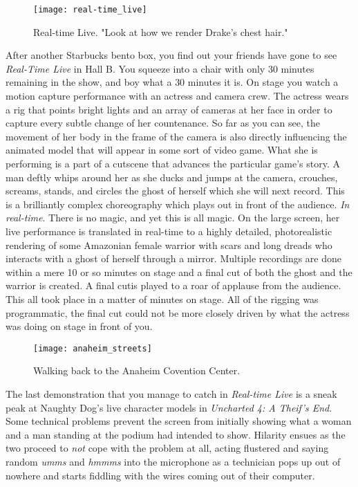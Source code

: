 \documentclass[../main.tex]{subfiles}
\begin{document}
\begin{figure}[h!]
	\centering
	\texttt{[image: real-time\_live]}
	\caption*{Real-time Live. "Look at how we render Drake's chest hair."}
\end{figure}

After another Starbucks bento box, you find out your friends have gone to see \textit{Real-Time Live} in Hall B. You squeeze into a chair with only 30 minutes remaining in the show, and boy what a 30 minutes it is. On stage you watch a motion capture performance with an actress and camera crew. The actress wears a rig that points bright lights and an array of cameras at her face in order to capture every subtle change of her countenance.  So far as you can see, the movement of her body in the frame of the camera is also directly influencing the animated model that will appear in some sort of video game. What she is performing is a part of a cutscene that advances the particular game's story. A man deftly whips around her as she ducks and jumps at the camera, crouches, screams, stands, and circles the ghost of herself which she will next record. This is a brilliantly complex choreography which plays out in front of the audience. \textit{In real-time}. There is no magic, and yet this is all magic. On the large screen, her live performance is translated in real-time to a highly detailed, photorealistic rendering of some Amazonian female warrior with scars and long dreads who interacts with a ghost of herself through a mirror. Multiple recordings are done within a mere 10 or so minutes on stage and a final cut of both the ghost and the warrior is created. A final cutis played to a roar of applause from the audience. This all took place in a matter of minutes on stage. All of the rigging was programmatic, the final cut could not be more closely driven by what the actress was doing on stage in front of you.

\begin{figure}[h!]
	\centering
	\texttt{[image: anaheim\_streets]}
	\caption*{Walking back to the Anaheim Covention Center.}
\end{figure}


The last demonstration that you manage to catch in \textit{Real-time Live} is a sneak peak at Naughty Dog's live character models in \textit{Uncharted 4: A Theif's End}. Some technical problems prevent the screen from initially showing what a woman and a man standing at the podium had intended to show. Hilarity ensues as the two proceed to \textit{not} cope with the problem at all, acting flustered and saying random \textit{umms} and \textit{hmmms} into the microphone as a technician pops up out of nowhere and starts fiddling with the wires coming out of their computer. 
\end{document}
